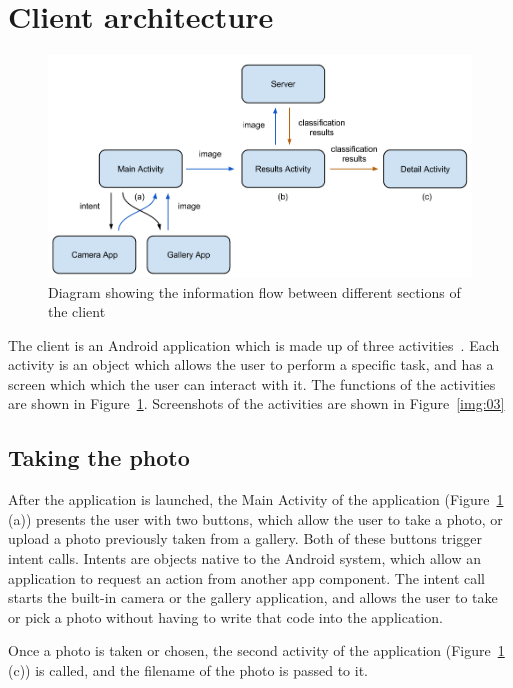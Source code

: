 \documentclass[11pt, a4paper]{report}
\begin{document}
\section{Client architecture} 

\begin{figure}[h]
	\centering
  \includegraphics[totalheight=9cm]{img/12.png}
  \caption{Diagram showing the information flow between different sections of the client}
  \label{img:12}
\end{figure}

The client is an Android application which is made up of three activities~\cite{AndroidDev:Activity}. Each activity is an object which allows the user to perform a specific task, and has a screen which which the user can interact with it. The functions of the activities are shown in Figure~\ref{img:12}. Screenshots of the activities are shown in Figure~\ref{img:03} 



\subsection{Taking the photo}

After the application is launched, the Main Activity of the application (Figure~\ref{img:12} (a)) presents the user with two buttons, which allow the user to take a photo, or upload a photo previously taken from a gallery. Both of these buttons trigger intent calls. Intents are objects native to the Android system, which allow an application to request an action from another app component. The intent call starts the built-in camera or the gallery application, and allows the user to take or pick a photo without having to write that code into the application. 

Once a photo is taken or chosen, the second activity of the application (Figure~\ref{img:12} (c)) is called, and the filename of the photo is passed to it. 
\end{document}
